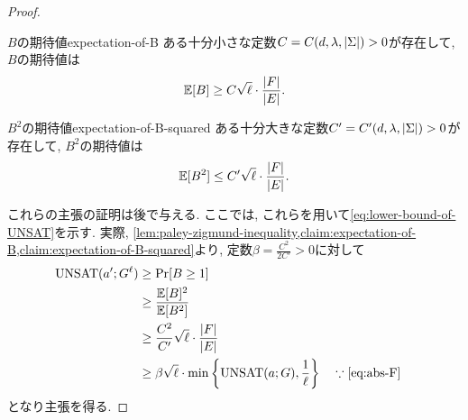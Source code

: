 \begin{proof}
\begin{claim}{$B$の期待値}{expectation-of-B}
  ある十分小さな定数$C=C(d,\lambda,\abs{\Sigma})>0$が存在して, $B$の期待値は
  \begin{align*}
    \operatorname*{\mathbb{E}}[B] \ge C\sqrt{\ell} \cdot \frac{\abs{F}}{\abs{E}}.
  \end{align*}
\end{claim}

\begin{claim}{$B^2$の期待値}{expectation-of-B-squared}
  ある十分大きな定数$C'=C'(d,\lambda,\abs{\Sigma})>0$が存在して, $B^2$の期待値は
  \begin{align*}
    \operatorname*{\mathbb{E}}[B^2] \le C'\sqrt{\ell} \cdot \frac{\abs{F}}{\abs{E}}.
  \end{align*}
\end{claim}

これらの主張の証明は後で与える.
ここでは, これらを用いて\cref{eq:lower-bound-of-UNSAT}を示す.
実際, \cref{lem:paley-zigmund-inequality,claim:expectation-of-B,claim:expectation-of-B-squared}より, 定数$\beta=\frac{C^2}{2C'}>0$に対して
\begin{align*}
  \UNSAT(a';G^\ell) &\ge \Pr[B\ge 1] \\
  &\ge \frac{\E[B]^2}{\E[B^2]} \\
  &\ge \frac{C^2}{C'} \sqrt{\ell} \cdot \frac{\abs{F}}{\abs{E}} \\
  & \ge \beta \sqrt{\ell} \cdot \min\qty{ \UNSAT(a;G), \frac{1}{\ell} } & & \because \text{\cref{eq:abs-F}}
\end{align*}
となり主張を得る.

\end{proof}

